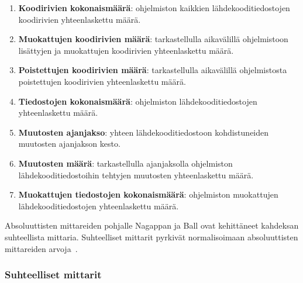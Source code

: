 \documentclass[finnish]{tktltiki2}
\theoremstyle{definition}
\theoremstyle{remark}
\begin{document}
\begin{enumerate}
    \item \textbf{Koodirivien kokonaismäärä}: ohjelmiston kaikkien lähdekooditiedostojen koodirivien yhteenlaskettu määrä.
    \item \textbf{Muokattujen koodirivien määrä}: tarkastellulla aikavälillä ohjelmistoon lisättyjen ja muokattujen koodirivien yhteenlaskettu määrä.
    \item \textbf{Poistettujen koodirivien määrä}: tarkastellulla aikavälillä ohjelmistosta poistettujen koodirivien yhteenlaskettu määrä.
    \item \textbf{Tiedostojen kokonaismäärä}: ohjelmiston lähdekooditiedostojen yhteenlaskettu määrä.
    \item \textbf{Muutosten ajanjakso}: yhteen lähdekooditiedostoon kohdistuneiden muutosten ajanjakson kesto.
    \item \textbf{Muutosten määrä}: tarkastellulla ajanjaksolla ohjelmiston lähdekooditiedostoihin tehtyjen muutosten yhteenlaskettu määrä.
    \item \textbf{Muokattujen tiedostojen kokonaismäärä}: ohjelmiston muokattujen lähdekooditiedostojen yhteenlaskettu määrä.
\end{enumerate}

Absoluuttisten mittareiden pohjalle Nagappan ja Ball ovat kehittäneet kahdeksan suhteellista mittaria. Suhteelliset mittarit pyrkivät normalisoimaan absoluuttisten mittareiden arvoja~\cite{NB05}.

\subsubsection{Suhteelliset mittarit}
\end{document}
